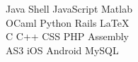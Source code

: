 \documentclass[letterpaper]{deedy-resume} %
\begin{document}
\begin{minipage}[t]{0.33\textwidth}
Java \textbullet{} Shell \textbullet{} JavaScript \textbullet{} Matlab \\
OCaml \textbullet{} Python \textbullet{} Rails \textbullet{} \LaTeX\ \\
C \textbullet{} C++ \textbullet{} CSS \textbullet{} PHP \textbullet{} Assembly \\
AS3 \textbullet{} iOS \textbullet{} Android \textbullet{} MySQL

\sectionspace %


\end{minipage} %
\hfill
%
%
\end{document}
